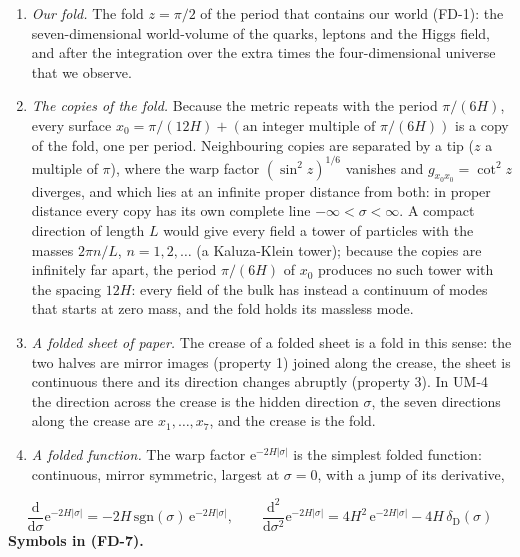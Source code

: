 \documentclass[
  10pt,
]{article}
\providecommand{\tightlist}{%
  \setlength{\itemsep}{0pt}\setlength{\parskip}{0pt}}
\begin{document}
\begin{enumerate}
\def\labelenumi{\arabic{enumi}.}
\tightlist
\item
  \emph{Our fold.} The fold \(z = \pi/2\) of the period that contains
  our world (FD-1): the seven-dimensional world-volume of the quarks,
  leptons and the Higgs field, and after the integration over the extra
  times the four-dimensional universe that we observe.
\item
  \emph{The copies of the fold.} Because the metric repeats with the
  period \(\pi/(6H)\), every surface
  \(x_0 = \pi/(12H) + (\text{an integer multiple of } \pi/(6H))\) is a
  copy of the fold, one per period. Neighbouring copies are separated by
  a tip (\(z\) a multiple of \(\pi\)), where the warp factor
  \((\sin^2z)^{1/6}\) vanishes and \(g_{x_0x_0} = \cot^2z\) diverges,
  and which lies at an infinite proper distance from both: in proper
  distance every copy has its own complete line
  \(-\infty < \sigma < \infty\). A compact direction of length \(L\)
  would give every field a tower of particles with the masses
  \(2\pi n/L\), \(n = 1, 2, \dots\) (a Kaluza-Klein tower); because the
  copies are infinitely far apart, the period \(\pi/(6H)\) of \(x_0\)
  produces no such tower with the spacing \(12H\): every field of the
  bulk has instead a continuum of modes that starts at zero mass, and
  the fold holds its massless mode.
\item
  \emph{A folded sheet of paper.} The crease of a folded sheet is a fold
  in this sense: the two halves are mirror images (property 1) joined
  along the crease, the sheet is continuous there and its direction
  changes abruptly (property 3). In UM-4 the direction across the crease
  is the hidden direction \(\sigma\), the seven directions along the
  crease are \(x_1, \dots, x_7\), and the crease is the fold.
\item
  \emph{A folded function.} The warp factor
  \(\mathrm{e}^{-2H\lvert\sigma\rvert}\) is the simplest folded
  function: continuous, mirror symmetric, largest at \(\sigma = 0\),
  with a jump of its derivative,
\end{enumerate}

\[
\frac{\mathrm{d}}{\mathrm{d}\sigma}\mathrm{e}^{-2H\lvert\sigma\rvert} = -2H\,\mathrm{sgn}(\sigma)\,\mathrm{e}^{-2H\lvert\sigma\rvert},\qquad
\frac{\mathrm{d}^2}{\mathrm{d}\sigma^2}\mathrm{e}^{-2H\lvert\sigma\rvert} = 4H^2\,\mathrm{e}^{-2H\lvert\sigma\rvert} - 4H\,\delta_{\mathrm{D}}(\sigma) \tag{FD-7}
\] \textbf{Symbols in (FD-7).}
\end{document}
